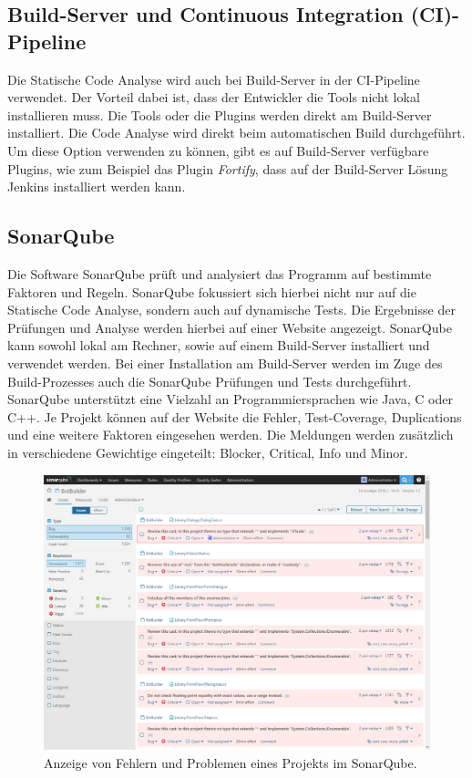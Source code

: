 \subsection{Build-Server und Continuous Integration (CI)-Pipeline}
Die Statische Code Analyse wird auch bei Build-Server in der CI-Pipeline verwendet. \cite{zampetti2017open} Der Vorteil dabei ist, dass der Entwickler die Tools nicht lokal installieren muss. Die Tools oder die Plugins werden direkt am Build-Server installiert. Die Code Analyse wird direkt beim automatischen Build durchgeführt. Um diese Option verwenden zu können, gibt es auf Build-Server verfügbare Plugins, wie zum Beispiel das Plugin \textit{Fortify}, dass auf der Build-Server Lösung Jenkins installiert werden kann.
\subsection{SonarQube}
Die Software SonarQube prüft und analysiert das Programm auf bestimmte Faktoren und Regeln. SonarQube fokussiert sich hierbei nicht nur auf die Statische Code Analyse, sondern auch auf dynamische Tests. Die Ergebnisse der Prüfungen und Analyse werden hierbei auf einer Website angezeigt. SonarQube kann sowohl lokal am Rechner, sowie auf einem Build-Server installiert und verwendet werden. Bei einer Installation am Build-Server werden im Zuge des Build-Prozesses auch die SonarQube Prüfungen und Tests durchgeführt. SonarQube unterstützt eine Vielzahl an Programmiersprachen wie Java, C oder C++. Je Projekt können auf der Website die Fehler, Test-Coverage, Duplications und eine weitere Faktoren eingesehen werden. Die Meldungen werden zusätzlich in verschiedene Gewichtige eingeteilt: Blocker, Critical, Info und Minor. \cite{sonarQubeHeise}

\begin{figure}[tp]
  \centering
  \includegraphics[height=8cm]{images/sonarQube.PNG}
 \caption[Anzeige von Fehlern und Problemen eines Projekts im SonarQube]{Anzeige von Fehlern und Problemen eines Projekts im SonarQube.}
  \label{fig:engine}
\end{figure}

